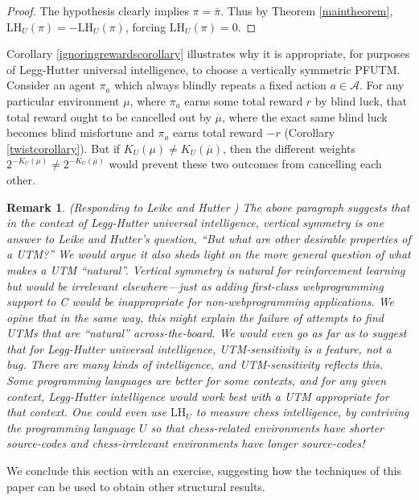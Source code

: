 \documentclass{article}
\newtheorem{remark}[theorem]{Remark}
\def\LH{\textrm{LH}}
\begin{document}
\begin{proof}
    The hypothesis clearly implies $\pi=\overline\pi$. Thus by Theorem
    \ref{maintheorem}, $\LH_U(\pi)=-\LH_U(\pi)$,
    forcing $\LH_U(\pi)=0$.
\end{proof}

Corollary \ref{ignoringrewardscorollary} illustrates why it is appropriate, for
purposes of Legg-Hutter universal intelligence, to choose a vertically symmetric PFUTM.
Consider an agent $\pi_a$
which always blindly repeats a fixed action $a\in\mathcal A$.
For any particular environment $\mu$,
where $\pi_a$ earns some total reward $r$ by blind luck,
that total reward ought to be cancelled out by $\overline\mu$, where
the exact same blind luck becomes blind misfortune and $\pi_a$ earns total reward
$-r$ (Corollary \ref{twistcorollary}). But if $K_U(\mu)\not=K_U(\overline\mu)$,
then the different weights $2^{-K_U(\mu)}\not=2^{-K_U(\overline\mu)}$ would prevent
these two outcomes from cancelling each other.

\begin{remark}
\label{leikeresponse}
\emph{(Responding to Leike and Hutter \cite{leike2015bad})
The above paragraph suggests that in the context of Legg-Hutter universal intelligence,
vertical symmetry is one answer to Leike and Hutter's question,
``But what are other desirable properties of a UTM?'' We would argue it also sheds light
on the more general question of what makes a UTM ``natural''. Vertical symmetry is
natural for reinforcement learning but would be irrelevant elsewhere---just
as adding first-class webprogramming support to C would be inappropriate for
non-webprogramming applications.
We opine that in the same way, this might explain the failure of
attempts \cite{muller2010stationary} to find UTMs that are ``natural'' across-the-board.
We would even go as far as to suggest that for
Legg-Hutter universal intelligence, UTM-sensitivity is a feature, not a bug. There are many
kinds of intelligence, and UTM-sensitivity
reflects this. Some programming
languages are better for some contexts, and for any given context, Legg-Hutter intelligence
would work best with a UTM appropriate for that context. One could even use $\LH_U$ to
measure chess intelligence, by contriving the programming language $U$ so that chess-related
environments have shorter source-codes and chess-irrelevant environments have longer
source-codes!}
\end{remark}

We conclude this section with an exercise, suggesting how the techniques of this paper
can be used to obtain other structural results.
\end{document}
